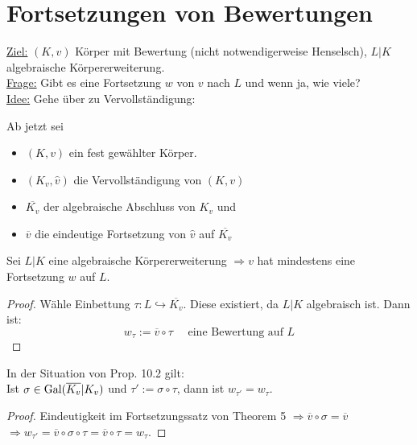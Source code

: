
\section{Fortsetzungen von Bewertungen}

\underline{Ziel:} $(K,v)$ Körper mit Bewertung (nicht notwendigerweise Henselsch), $L|K$ algebraische Körpererweiterung.\\
\underline{Frage:} Gibt es eine Fortsetzung $w$ von $v$ nach $L$ und wenn ja, wie viele?\\
\underline{Idee:} Gehe über zu Vervollständigung:

\begin{Not}
Ab jetzt sei
\begin{itemize}
\item $(K,v)$ ein fest gewählter Körper.
\item $(K_v, \hat{v})$ die Vervollständigung von $(K,v)$
\item $\overline{K_v}$ der algebraische Abschluss von $K_v$ und
\item $\overline{v}$ die eindeutige Fortsetzung von $\hat{v}$ auf $\overline{K_v}$
\end{itemize}
\end{Not}

\begin{Prop}
Sei $L|K$ eine algebraische Körpererweiterung $\Rightarrow v$ hat mindestens eine Fortsetzung $w$ auf $L$.
\end{Prop}

\begin{proof}
Wähle Einbettung $\tau: L \hookrightarrow \overline{K_v}$. Diese existiert, da $L|K$ algebraisch ist. Dann ist:
\[ w_\tau := \overline{v} \circ \tau \quad \text{ eine Bewertung auf } L\]
\end{proof}

\begin{Bem}
In der Situation von Prop. 10.2 gilt:\\
Ist $\sigma \in \operatorname{Gal}(\overline{K_v}|K_v)$ und $\tau':=\sigma \circ \tau$, dann ist $w_{\tau'}=w_\tau$.
\end{Bem}

\begin{proof}
Eindeutigkeit im Fortsetzungssatz von Theorem 5 $\Rightarrow \overline{v} \circ \sigma = \overline{v}$
$\Rightarrow w_{\tau'} = \overline{v} \circ \sigma \circ \tau = \overline{v} \circ \tau = w_\tau$.
\end{proof}

